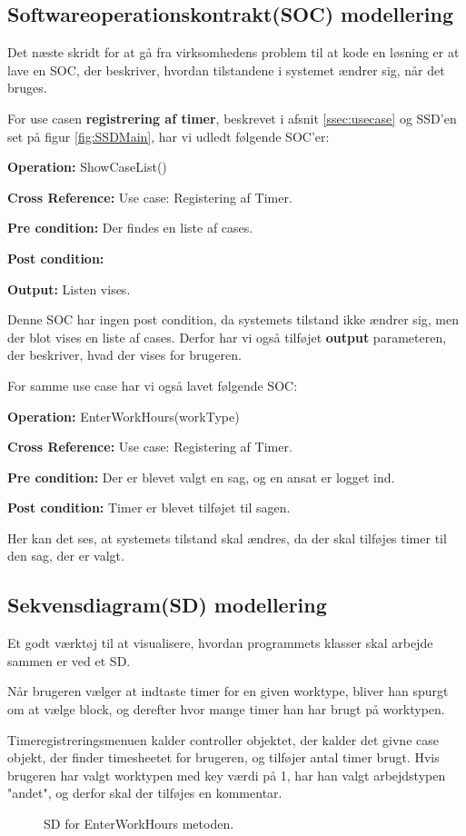 \subsection{Softwareoperationskontrakt(SOC) modellering}

Det næste skridt for at gå fra virksomhedens problem til at kode en løsning er at lave en SOC, der beskriver, hvordan tilstandene i systemet ændrer sig, når det bruges.

For use casen \textbf{registrering af timer}, beskrevet i afsnit \ref{ssec:usecase} og SSD'en set på figur \ref{fig:SSDMain}, har vi udledt følgende SOC'er:

\textbf{Operation:} ShowCaseList()

\textbf{Cross Reference:} Use case: Registering af Timer.

\textbf{Pre condition:} Der findes en liste af cases.

\textbf{Post condition:}

\textbf{Output:} Listen vises.

Denne SOC har ingen post condition, da systemets tilstand ikke ændrer sig, men der blot vises en liste af cases.
Derfor har vi også tilføjet \textbf{output} parameteren, der beskriver, hvad der vises for brugeren.

For samme use case har vi også lavet følgende SOC:

\textbf{Operation:} EnterWorkHours(workType)

\textbf{Cross Reference:} Use case: Registering af Timer.

\textbf{Pre condition:} Der er blevet valgt en sag, og en ansat er logget ind.

\textbf{Post condition:} Timer er blevet tilføjet til sagen.

Her kan det ses, at systemets tilstand skal ændres, da der skal tilføjes timer til den sag, der er valgt.

\subsection{Sekvensdiagram(SD) modellering}

Et godt værktøj til at visualisere, hvordan programmets klasser skal arbejde sammen er ved et SD.

Når brugeren vælger at indtaste timer for en given worktype, bliver han spurgt om at vælge block, og derefter hvor mange timer han har brugt på worktypen.

Timeregistreringsmenuen kalder controller objektet, der kalder det givne case objekt, der finder timesheetet for brugeren, og tilføjer antal timer brugt.
Hvis brugeren har valgt worktypen med key værdi på 1, har han valgt arbejdstypen "andet", og derfor skal der tilføjes en kommentar.
\begin{figure}[H]
    \caption{SD for EnterWorkHours metoden.}
    \label{fig:SDEnterWorkHours}
\end{figure}

